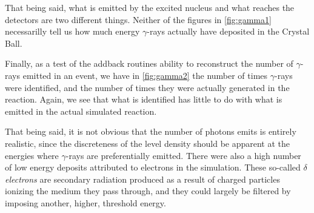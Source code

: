 That being said, what is emitted by the excited nucleus and what reaches the detectors are two different things. Neither of the figures in \autoref{fig:gamma1} necessarilly tell us how much energy $\gamma$-rays actually have deposited in the Crystal Ball. 

Finally, as a test of the addback routines ability to reconstruct the number of $\gamma$-rays emitted in an event, we have in \autoref{fig:gamma2} the number of times $\gamma$-rays were identified, and the number of times they were actually generated in the reaction. Again, we see that what is identified has little to do with what is emitted in the actual simulated reaction.

That being said, it is not obvious that the number of photons \codename{} emits is entirely realistic, since the discreteness of the level density should be apparent at the energies where $\gamma$-rays are preferentially emitted. There were also a high number of low energy deposits attributed to electrons in the simulation. These so-called \emph{$\delta$ electrons} are secondary radiation produced as a result of charged particles ionizing the medium they pass through, and they could largely be filtered by imposing another, higher, threshold energy. 

